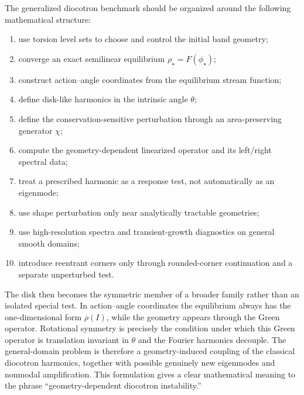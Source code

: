 \documentclass[11pt,a4paper]{article}
\begin{document}
The generalized diocotron benchmark should be organized around the following mathematical structure:
\begin{enumerate}
  \item use torsion level sets to choose and control the initial band geometry;
  \item converge an exact semilinear equilibrium $\rho_\star=F(\phi_\star)$;
  \item construct action--angle coordinates from the equilibrium stream function;
  \item define disk-like harmonics in the intrinsic angle $\theta$;
  \item define the conservation-sensitive perturbation through an area-preserving generator $\chi$;
  \item compute the geometry-dependent linearized operator and its left/right spectral data;
  \item treat a prescribed harmonic as a response test, not automatically as an eigenmode;
  \item use shape perturbation only near analytically tractable geometries;
  \item use high-resolution spectra and transient-growth diagnostics on general smooth domains;
  \item introduce reentrant corners only through rounded-corner continuation and a separate unperturbed test.
\end{enumerate}

The disk then becomes the symmetric member of a broader family rather than an isolated special test. In action--angle coordinates the equilibrium always has the one-dimensional form $\overline\rho(I)$, while the geometry appears through the Green operator. Rotational symmetry is precisely the condition under which this Green operator is translation invariant in $\theta$ and the Fourier harmonics decouple. The general-domain problem is therefore a geometry-induced coupling of the classical diocotron harmonics, together with possible genuinely new eigenmodes and nonmodal amplification. This formulation gives a clear mathematical meaning to the phrase ``geometry-dependent diocotron instability.''
\end{document}
